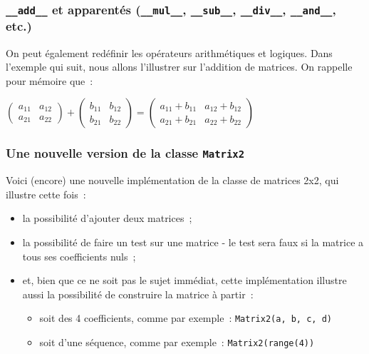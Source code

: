     \hypertarget{add__-et-apparentuxe9s-__mul__-__sub__-__div__-__and__-etc.}{%
\subsubsection{\texorpdfstring{\texttt{\_\_add\_\_} et apparentés
(\texttt{\_\_mul\_\_}, \texttt{\_\_sub\_\_}, \texttt{\_\_div\_\_},
\texttt{\_\_and\_\_},
etc.)}{\_\_add\_\_ et apparentés (\_\_mul\_\_, \_\_sub\_\_, \_\_div\_\_, \_\_and\_\_, etc.)}}\label{add__-et-apparentuxe9s-__mul__-__sub__-__div__-__and__-etc.}}

    On peut également redéfinir les opérateurs arithmétiques et logiques.
Dans l'exemple qui suit, nous allons l'illustrer sur l'addition de
matrices. On rappelle pour mémoire que~:

\(\left( \begin{array}{cc} a_{11} & a_{12} \\ a_{21} & a_{22}\end{array} \right) + \left( \begin{array}{cc} b_{11} & b_{12} \\ b_{21} & b_{22}\end{array} \right) = \left( \begin{array}{cc} a_{11}+b_{11} & a_{12}+b_{12} \\ a_{21}+b_{21} & a_{22}+b_{22}\end{array} \right)\)

    \hypertarget{une-nouvelle-version-de-la-classe-matrix2}{%
\subsubsection{\texorpdfstring{Une nouvelle version de la classe
\texttt{Matrix2}}{Une nouvelle version de la classe Matrix2}}\label{une-nouvelle-version-de-la-classe-matrix2}}

    Voici (encore) une nouvelle implémentation de la classe de matrices 2x2,
qui illustre cette fois~:

\begin{itemize}
\tightlist
\item
  la possibilité d'ajouter deux matrices~;
\item
  la possibilité de faire un test sur une matrice - le test sera faux si
  la matrice a tous ses coefficients nuls~;
\item
  et, bien que ce ne soit pas le sujet immédiat, cette implémentation
  illustre aussi la possibilité de construire la matrice à partir~:

  \begin{itemize}
  \tightlist
  \item
    soit des 4 coefficients, comme par exemple~:
    \texttt{Matrix2(a,\ b,\ c,\ d)}
  \item
    soit d'une séquence, comme par exemple~: \texttt{Matrix2(range(4))}
  \end{itemize}
\end{itemize}

